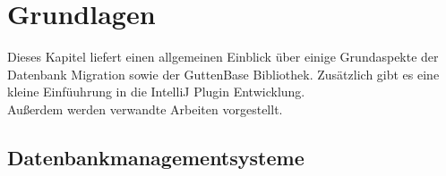 \chapter{Grundlagen}
Dieses Kapitel liefert einen allgemeinen Einblick über einige Grundaspekte der Datenbank Migration sowie der GuttenBase Bibliothek. Zusätzlich gibt es eine kleine Einfüuhrung in die IntelliJ Plugin Entwicklung.\\
Außerdem werden verwandte Arbeiten vorgestellt. 
\section{Datenbankmanagementsysteme}
%	
	
